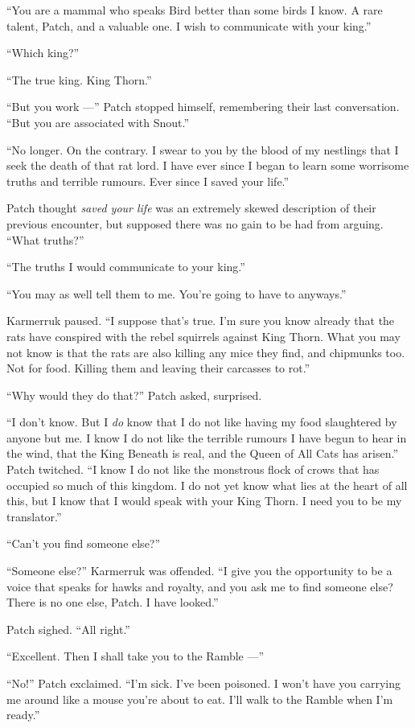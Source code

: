 \documentclass[ebook,oneside,openany,12pt]{memoir}
\begin{document}
“You are a mammal who speaks Bird better than some birds I know. A
rare talent, Patch, and a valuable one. I wish to communicate with
your king.”

“Which king?”

“The true king. King Thorn.”

“But you work —” Patch stopped himself, remembering their last
conversation. “But you are associated with Snout.”

“No longer. On the contrary. I swear to you by the blood of my
nestlings that I seek the death of that rat lord. I have ever since I
began to learn some worrisome truths and terrible rumours. Ever since
I saved your life.”

Patch thought \emph{saved your life} was an extremely skewed
description of their previous encounter, but supposed there was no
gain to be had from arguing. “What truths?”

“The truths I would communicate to your king.”

“You may as well tell them to me. You’re going to have to anyways.”

Karmerruk paused. “I suppose that’s true. I’m sure you know already
that the rats have conspired with the rebel squirrels against King
Thorn. What you may not know is that the rats are also killing any
mice they find, and chipmunks too. Not for food. Killing them and
leaving their carcasses to rot.”

“Why would they do that?” Patch asked, surprised.

“I don’t know. But I \emph{do} know that I do not like having my
food slaughtered by anyone but me. I know I do not like the terrible
rumours I have begun to hear in the wind, that the King Beneath is
real, and the Queen of All Cats has arisen.” Patch twitched. “I know I
do not like the monstrous flock of crows that has occupied so much of
this kingdom. I do not yet know what lies at the heart of all this,
but I know that I would speak with your King Thorn. I need you to be
my translator.”

“Can’t you find someone else?”

“Someone else?” Karmerruk was offended. “I give you the opportunity to
be a voice that speaks for hawks and royalty, and you ask me to find
someone else? There is no one else, Patch. I have looked.”

Patch sighed. “All right.”

“Excellent. Then I shall take you to the Ramble —”

“No!” Patch exclaimed. “I’m sick. I’ve been poisoned. I won’t have you
carrying me around like a mouse you’re about to eat. I’ll walk to the
Ramble when I’m ready.”
\end{document}
